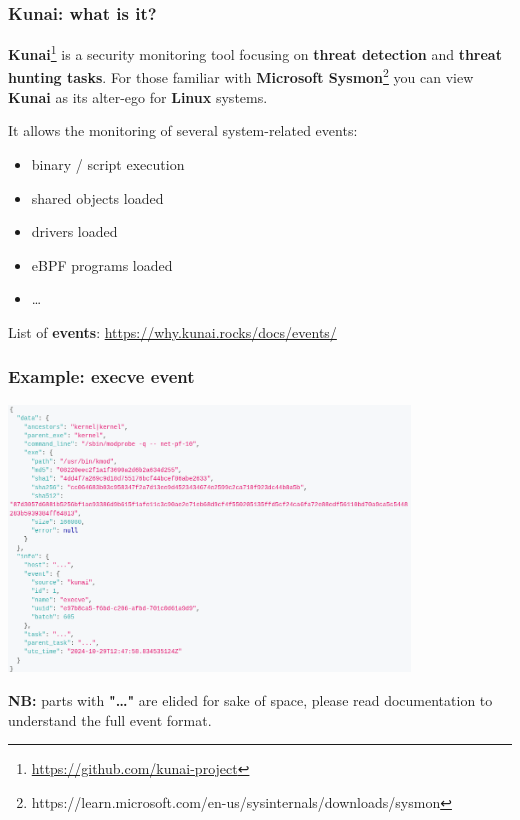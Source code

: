 \begin{frame}
	\frametitle{Kunai: what is it?}

	\textbf{Kunai}\footnote{\url{https://github.com/kunai-project}} is a security monitoring tool focusing on \textbf{threat detection} and \textbf{threat hunting tasks}. For those familiar with \textbf{Microsoft Sysmon}\footnote{https://learn.microsoft.com/en-us/sysinternals/downloads/sysmon} you can view \textbf{Kunai} as its alter-ego for \textbf{Linux} systems.

	\vspace{1em}

	\par
	It allows the monitoring of several system-related events:
	\begin{itemize}
		\item binary / script execution
		\item shared objects loaded
		\item drivers loaded
		\item eBPF programs loaded
		\item \ldots
	\end{itemize}

	\par
	\vspace{1em}
	List of \textbf{events}: \url{https://why.kunai.rocks/docs/events/}
\end{frame}

\begin{frame}
	\frametitle{Example: execve event}

	\centering
	\includegraphics[width=0.8\textwidth]{img/kunai-execve.png}

	\textbf{NB:} parts with \textbf{"\ldots"} are elided for sake of space, please read documentation to understand the full event format.
\end{frame}

